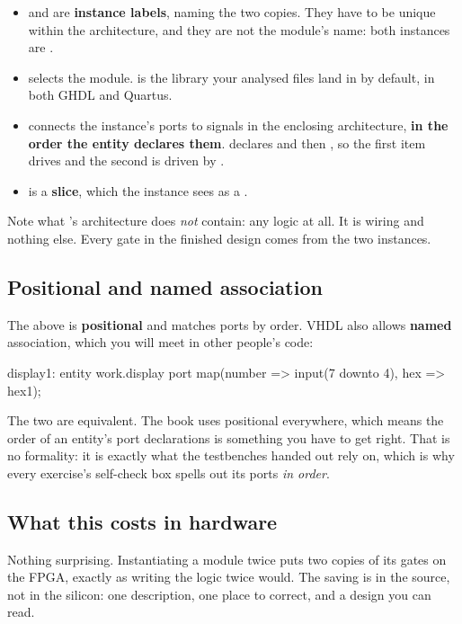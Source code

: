 \begin{itemize}
  \item {} and  are \textbf{instance labels}, naming the two copies.
    They have to be unique within the architecture, and they are not the module's name: both
    instances are .
  \item {} selects the module.  is the library your analysed
    files land in by default, in both GHDL and Quartus.
  \item {} connects the instance's ports to signals in the enclosing
    architecture, \textbf{in the order the entity declares them}.  declares
     and then , so the first item drives  and the second is
    driven by .
  \item {} is a \textbf{slice}, which the instance sees as a
    .
\end{itemize}

Note what 's architecture does \emph{not} contain: any logic at all. It is wiring
and nothing else. Every gate in the finished design comes from the two  instances.

\subsection*{Positional and named association}
The  above is \textbf{positional} and matches ports by order. VHDL also allows
\textbf{named} association, which you will meet in other people's code:

\begin{vhdlcode}
display1: entity work.display
    port map(number => input(7 downto 4), hex => hex1);
\end{vhdlcode}

The two are equivalent. The book uses positional everywhere, which means the order of an entity's
port declarations is something you have to get right. That is no formality: it is exactly what the
testbenches handed out rely on, which is why every exercise's self-check box spells out its ports
\emph{in order}.

\subsection*{What this costs in hardware}
Nothing surprising. Instantiating a module twice puts two copies of its gates on the FPGA, exactly
as writing the logic twice would. The saving is in the source, not in the silicon: one description,
one place to correct, and a design you can read.
